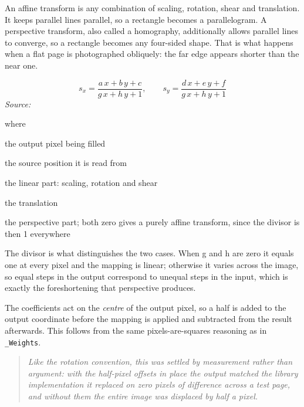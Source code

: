 An affine transform is any combination of scaling, rotation, shear and translation. It keeps parallel lines parallel, so a rectangle becomes a parallelogram. A perspective transform, also called a homography, additionally allows parallel lines to converge, so a rectangle becomes any four-sided shape. That is what happens when a flat page is photographed obliquely: the far edge appears shorter than the near one.



\begin{equation}
s_x = \frac{a\,x + b\,y + c}{g\,x + h\,y + 1}, \qquad s_y = \frac{d\,x + e\,y + f}{g\,x + h\,y + 1}
\end{equation}
\noindent\emph{Source: }\cite{wolberg1990}


\noindent where
\begin{description}[leftmargin=2.4em,style=nextline,font=\normalfont\ttfamily]\setlength\itemsep{1pt}
  \item[{$x,\, y$}] \normalfont the output pixel being filled
  \item[{$s_x,\, s_y$}] \normalfont the source position it is read from
  \item[{$a,\, b,\, d,\, e$}] \normalfont the linear part: scaling, rotation and shear
  \item[{$c,\, f$}] \normalfont the translation
  \item[{$g,\, h$}] \normalfont the perspective part; both zero gives a purely affine transform, since the divisor is then 1 everywhere
\end{description}
The divisor is what distinguishes the two cases. When g and h are zero it equals one at every pixel and the mapping is linear; otherwise it varies across the image, so equal steps in the output correspond to unequal steps in the input, which is exactly the foreshortening that perspective produces.


The coefficients act on the \emph{centre} of the output pixel, so a half is added to the output coordinate before the mapping is applied and subtracted from the result afterwards. This follows from the same pixels-are-squares reasoning as in \texttt{\_Weights}.


\begin{quote}\small\itshape Like the rotation convention, this was settled by measurement rather than argument: with the half-pixel offsets in place the output matched the library implementation it replaced on zero pixels of difference across a test page, and without them the entire image was displaced by half a pixel.\end{quote}



